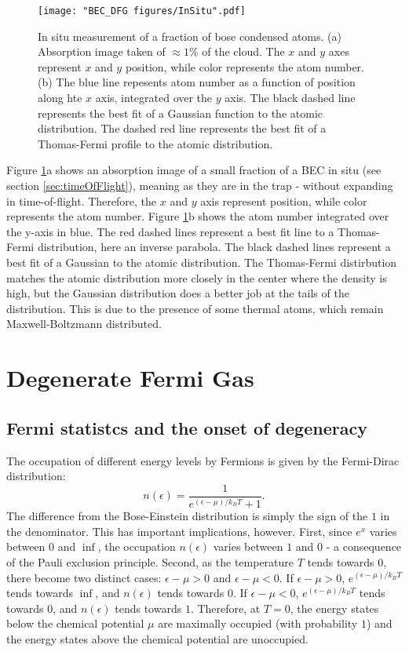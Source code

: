 \begin{figure}
	\texttt{[image: "BEC\_DFG figures/InSitu".pdf]}
\caption{In situ measurement of a fraction of bose condensed atoms. (a) Absorption image taken of $\approx1\%$ of the cloud. The $x$ and $y$ axes represent $x$ and $y$ position, while color represents the atom number. (b) The blue line repesents atom number as a function of position along hte $x$ axis, integrated over the $y$ axis. The black dashed line represents the best fit of a Gaussian function to the atomic distribution. The dashed red line represents the best fit of a Thomas-Fermi profile to the atomic distribution.}
\label{fig:InSitu}
\end{figure}

Figure \ref{fig:InSitu}a shows an absorption image of a small fraction of a BEC in situ (see section \ref{sec:timeOfFlight}), meaning as they are in the trap - without expanding in time-of-flight. Therefore, the $x$ and $y$ axis represent position, while color represents the atom number. Figure \ref{fig:InSitu}b shows the atom number integrated over the y-axis in blue. The red dashed lines represent a best fit line to a Thomas-Fermi distribution, here an inverse parabola. The black dashed lines represent a best fit of a Gaussian to the atomic distribution. The Thomas-Fermi distirbution matches the atomic distribution more closely in the center where the density is high, but the Gaussian distribution does a better job at the tails of the distribution. This is due to the presence of some thermal atoms, which remain Maxwell-Boltzmann distributed. 


\section{Degenerate Fermi Gas}
\subsection{Fermi statistcs and the onset of degeneracy}
The occupation of different energy levels by Fermions is given by the Fermi-Dirac distribution:
\begin{equation}
n(\epsilon)= \frac{1}{e^{(\epsilon-\mu)/k_BT}+1}.
\end{equation}
The difference from the Bose-Einstein distribution is simply the sign of the $1$ in the denominator. This has important implications, however. First, since $e^x$ varies between $0$ and $\inf$, the occupation $n(\epsilon)$ varies between $1$ and $0$ - a consequence of the Pauli exclusion principle. Second, as the temperature $T$ tends towards $0$, there become two distinct cases: $\epsilon-\mu>0$ and $\epsilon-\mu<0$. If $\epsilon-\mu>0$, $e^{(\epsilon-\mu)/k_BT}$ tends towards $\inf$, and $n(\epsilon)$ tends towards $0$. If  $\epsilon-\mu<0$, $e^{(\epsilon-\mu)/k_BT}$ tends towards $0$, and $n(\epsilon)$ tends towards $1$. Therefore, at $T=0$, the energy states below the chemical potential $\mu$ are maximally occupied (with probability $1$) and the energy states above the chemical potential are unoccupied. 


